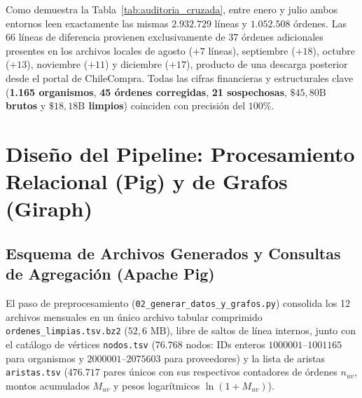 \documentclass[11pt,a4paper]{article}
\begin{document}
Como demuestra la Tabla~\ref{tab:auditoria_cruzada}, entre enero y julio ambos entornos leen exactamente las mismas $2.932.729$ líneas y $1.052.508$ órdenes. Las 66 líneas de diferencia provienen exclusivamente de 37 órdenes adicionales presentes en los archivos locales de agosto ($+7$ líneas), septiembre ($+18$), octubre ($+13$), noviembre ($+11$) y diciembre ($+17$), producto de una descarga posterior desde el portal de ChileCompra. Todas las cifras financieras y estructurales clave (\textbf{1.165 organismos}, \textbf{45 órdenes corregidas}, \textbf{21 sospechosas}, \textbf{$\$45,80\text{B}$ brutos} y \textbf{$\$18,18\text{B}$ limpios}) coinciden con precisión del $100\%$.

\section{Diseño del Pipeline: Procesamiento Relacional (Pig) y de Grafos (Giraph)}

\subsection{Esquema de Archivos Generados y Consultas de Agregación (Apache Pig)}

El paso de preprocesamiento (\texttt{02\_generar\_datos\_y\_grafos.py}) consolida los 12 archivos mensuales en un único archivo tabular comprimido \texttt{ordenes\_limpias.tsv.bz2} ($52,6\text{ MB}$), libre de saltos de línea internos, junto con el catálogo de vértices \texttt{nodos.tsv} ($76.768$ nodos: IDs enteros $1000001\text{--}1001165$ para organismos y $2000001\text{--}2075603$ para proveedores) y la lista de aristas \texttt{aristas.tsv} ($476.717$ pares únicos con sus respectivos contadores de órdenes $n_{uv}$, montos acumulados $M_{uv}$ y pesos logarítmicos $\ln(1 + M_{uv})$).
\end{document}
